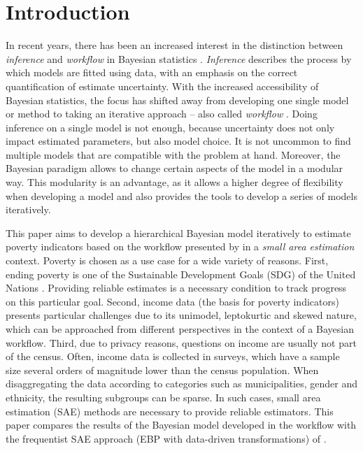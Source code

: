 \chapter{Introduction}

In recent years, there has been an increased interest in the distinction between \textit{inference} and \textit{workflow} in Bayesian statistics \citep{gelman_bayesian_2020}.
\textit{Inference} describes the process by which models are fitted using data, with an emphasis on the correct quantification of estimate uncertainty.
With the increased accessibility of Bayesian statistics, the focus has shifted away from developing one single model or method to taking an iterative approach – also called \textit{workflow} \citep{gelman_bayesian_2020}.
Doing inference on a single model is not enough, because uncertainty does not only impact estimated parameters, but also model choice.
It is not uncommon to find multiple models that are compatible with the problem at hand.
Moreover, the Bayesian paradigm allows to change certain aspects of the model in a modular way.
This modularity is an advantage, as it allows a higher degree of flexibility when developing a model and also provides the tools to develop a series of models iteratively.

This paper aims to develop a hierarchical Bayesian model \citep{molina_small_2014}   iteratively to estimate poverty indicators \citep{foster_class_1984} based on the workflow presented by \cite{gelman_bayesian_2020} in a \textit{small area estimation} \citep{rao_small_2015} context.
Poverty is chosen as a use case for a wide variety of reasons.
First, ending poverty is one of the Sustainable Development Goals (SDG) of the United Nations \citep{united_nations_transforming_2015}.
Providing reliable estimates is a necessary condition to track progress on this particular goal.
Second, income data (the basis for poverty indicators) presents particular challenges due to its unimodel, leptokurtic and skewed nature, which can be approached from different perspectives in the context of a Bayesian workflow.
Third, due to privacy reasons, questions on income are usually not part of the census.
Often, income data is collected in surveys, which have a sample size several orders of magnitude lower than the census population.
When disaggregating the data according to categories such as municipalities, gender and ethnicity, the resulting subgroups can be sparse.
In such cases, small area estimation (SAE) methods are necessary to provide reliable estimators.
This paper compares the results of the Bayesian model developed in the workflow with the frequentist SAE approach (EBP with data-driven transformations) of \cite{rojas_perilla_data_2020}.

